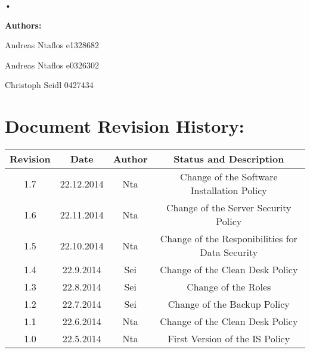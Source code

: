 


\pagestyle{empty} %

\titleGM %


\pagestyle{plain}

{\Huge •\begin{Large}
\textbf{Authors:}
\end{Large}}
\newline
\newline
\begin{large}
Andreas Ntaflos			e1328682
\end{large}
\newline
\newline
\begin{large}
Andreas Ntaflos			e0326302
\end{large}
\newline
\newline
\begin{large}
Christoph Seidl 		0427434
\end{large}


\tableofcontents




\chapter{Document Revision History:}

\begin{tabular}{|c|c|c|c|}
\hline 
Revision & Date & Author & Status and Description \\ 
\hline 
1.7 & 22.12.2014 & Nta &  Change of the Software Installation Policy\\ 
\hline 
1.6 & 22.11.2014 & Nta & Change of the Server Security Policy \\
\hline 
1.5 & 22.10.2014 & Nta & Change of the Responibilities for Data Security \\ 
\hline 
1.4 & 22.9.2014 & Sei & Change of the Clean Desk Policy \\ 
\hline 
1.3 & 22.8.2014 & Sei & Change of the Roles \\ 
\hline 
1.2 & 22.7.2014 & Sei & Change of the Backup Policy \\ 
\hline 
1.1 & 22.6.2014 & Nta & Change of the Clean Desk Policy \\ 
\hline 
1.0 & 22.5.2014 & Nta & First Version of the IS Policy \\ 
\hline 
\end{tabular} 



